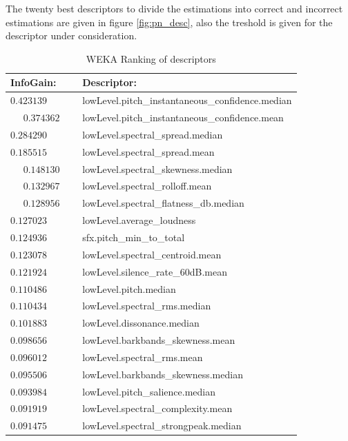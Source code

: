 \documentclass{article}
\begin{document}
 The twenty best descriptors to divide the estimations into correct and incorrect estimations are given in figure \ref{fig:pn_desc}, also the treshold is given for the descriptor under consideration.
\begin{table}[h]
    \begin{center}
        \begin{tabular}{ | l | l |}
            \hline
            InfoGain:   &   Descriptor: \\  \hline
            \hline
            $0.423139$  &   lowLevel.pitch\_instantaneous\_confidence.median \\ \hline
            $0.374362$  &   lowLevel.pitch\_instantaneous\_confidence.mean \\ \hline
            $0.284290$  &   lowLevel.spectral\_spread.median    \\  \hline
            $0.185515$  &   lowLevel.spectral\_spread.mean    \\  \hline
            $0.148130$  &   lowLevel.spectral\_skewness.median    \\  \hline
            $0.132967$  &   lowLevel.spectral\_rolloff.mean    \\  \hline
            $0.128956$  &   lowLevel.spectral\_flatness\_db.median    \\  \hline
            $0.127023$  &   lowLevel.average\_loudness    \\  \hline
            $0.124936$  &   sfx.pitch\_min\_to\_total    \\  \hline
            $0.123078$  &   lowLevel.spectral\_centroid.mean    \\  \hline
            $0.121924$  &   lowLevel.silence\_rate\_60dB.mean    \\  \hline
            $0.110486$  &   lowLevel.pitch.median    \\  \hline
            $0.110434$  &   lowLevel.spectral\_rms.median    \\  \hline
            $0.101883$  &   lowLevel.dissonance.median    \\  \hline
            $0.098656$  &   lowLevel.barkbands\_skewness.mean    \\  \hline
            $0.096012$  &   lowLevel.spectral\_rms.mean    \\  \hline
            $0.095506$  &   lowLevel.barkbands\_skewness.median    \\  \hline
            $0.093984$  &   lowLevel.pitch\_salience.median    \\  \hline
            $0.091919$  &   lowLevel.spectral\_complexity.mean    \\  \hline
            $0.091475$  &   lowLevel.spectral\_strongpeak.median    \\  \hline
        \end{tabular}
        \caption{WEKA Ranking of descriptors}
        \label{table:weka_desc}
    \end{center}
\end{table}
\end{document}
